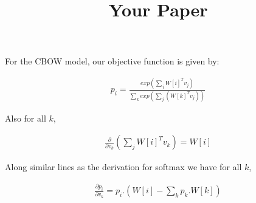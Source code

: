 \documentclass[a4paper]{article}
\title{Your Paper}
\begin{document}
For the CBOW model, our objective function is given by:

\begin{align}
p_i = \frac{exp(\sum_j W[i]^Tv_j)}{\sum_k exp(\sum_j ( W[k]^T v_j))}
\end{align}

Also for all $k$,

\begin{align}
\frac{\partial}{\partial v_k} \left( \sum_j W[i]^T v_k \right)= W[i]
\end{align}

Along similar lines as the derivation for softmax we have for all $k$,

\begin{align}
\frac{\partial p_i}{\partial v_k} = p_i.\left( W[i] - \sum_k p_k . W[k] \right)
\end{align}
\end{document}
